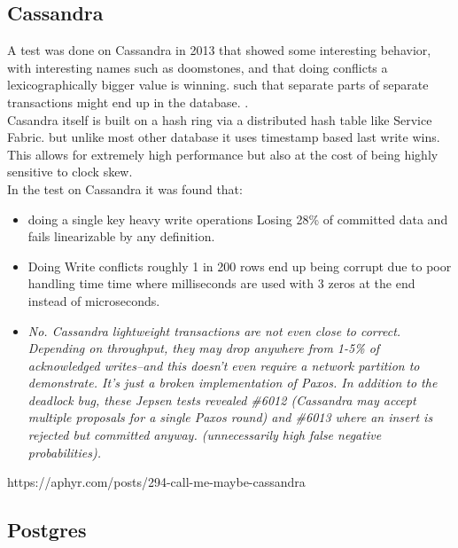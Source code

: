 \documentclass[a4paper,10pt,titlepage]{report}
\begin{document}
\subsection{Cassandra}
A test was done on Cassandra in 2013 that showed some interesting behavior, with interesting names such as doomstones, and that doing conflicts a lexicographically bigger value is winning. such that separate parts of separate transactions might end up in the database. .\\
\vspace{5mm}
Casandra itself is built on a hash ring via a distributed hash table like Service Fabric. but unlike most other database it uses timestamp based last write wins. This allows for extremely high performance but also at the cost of being highly sensitive to clock skew.\\

In the test on Cassandra it was found that:
\begin{itemize}
    \item doing a single key heavy write operations Losing 28\% of committed data and fails linearizable by any definition.
    \item Doing Write conflicts roughly 1 in 200 rows end up being corrupt due to poor handling time time where milliseconds are used with 3 zeros at the end instead of microseconds.
    \item \textit{No. Cassandra lightweight transactions are not even close to correct. Depending on throughput, they may drop anywhere from 1-5\% of acknowledged writes–and this doesn’t even require a network partition to demonstrate. It’s just a broken implementation of Paxos. In addition to the deadlock bug, these Jepsen tests revealed \#6012 (Cassandra may accept multiple proposals for a single Paxos round) and \#6013 where an insert is rejected but committed anyway. (unnecessarily high false negative probabilities).}
\end{itemize}

https://aphyr.com/posts/294-call-me-maybe-cassandra


\subsection{Postgres}
\end{document}
